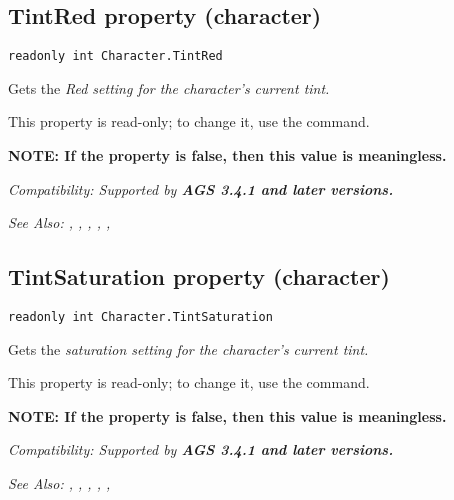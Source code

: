 \subsection{TintRed property (character)}\label{Character.TintRed}%

\begin{verbatim}
readonly int Character.TintRed
\end{verbatim}
Gets the \it{Red} setting for the character's current tint.

This property is read-only; to change it, use the  command.

\bf{NOTE:} If the  property is false, then
this value is meaningless.

\it{Compatibility:} Supported by \bf{AGS 3.4.1} and later versions.

\it{See Also:} , ,
, ,
, 


\subsection{TintSaturation property (character)}\label{Character.TintSaturation}%

\begin{verbatim}
readonly int Character.TintSaturation
\end{verbatim}
Gets the \it{saturation} setting for the character's current tint.

This property is read-only; to change it, use the  command.

\bf{NOTE:} If the  property is false, then
this value is meaningless.

\it{Compatibility:} Supported by \bf{AGS 3.4.1} and later versions.

\it{See Also:} , ,
, ,
, 


